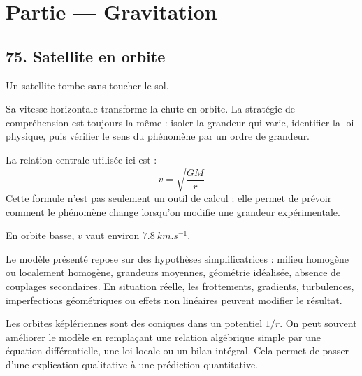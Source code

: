 \documentclass[11pt,a4paper]{article}
\begin{document}
\section{Partie — Gravitation}


\subsection{75. Satellite en orbite}

\begin{exemplebox}
Un satellite tombe sans toucher le sol.
\end{exemplebox}

\begin{methodebox}
Sa vitesse horizontale transforme la chute en orbite.
La stratégie de compréhension est toujours la même : isoler la grandeur qui varie, identifier la loi physique, puis vérifier le sens du phénomène par un ordre de grandeur.
\end{methodebox}

\begin{theorembox}
La relation centrale utilisée ici est :
\[
v=\sqrt{\frac{GM}{r}}
\]
Cette formule n'est pas seulement un outil de calcul : elle permet de prévoir comment le phénomène change lorsqu'on modifie une grandeur expérimentale.
\end{theorembox}

\begin{odgbox}
En orbite basse, $v$ vaut environ $\SI{7.8}{km.s^{-1}}$.
\end{odgbox}

\begin{attentionbox}
Le modèle présenté repose sur des hypothèses simplificatrices : milieu homogène ou localement homogène, grandeurs moyennes, géométrie idéalisée, absence de couplages secondaires. En situation réelle, les frottements, gradients, turbulences, imperfections géométriques ou effets non linéaires peuvent modifier le résultat.
\end{attentionbox}

\begin{approfondissementbox}
Les orbites képlériennes sont des coniques dans un potentiel $1/r$.
On peut souvent améliorer le modèle en remplaçant une relation algébrique simple par une équation différentielle, une loi locale ou un bilan intégral. Cela permet de passer d'une explication qualitative à une prédiction quantitative.
\end{approfondissementbox}
\end{document}

